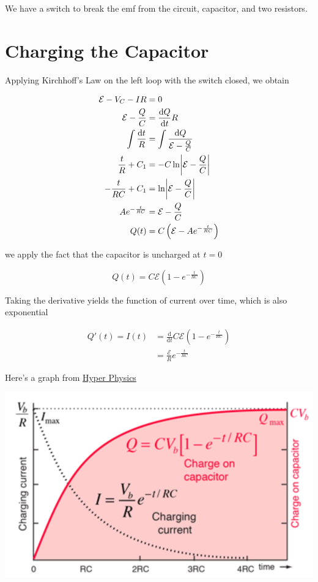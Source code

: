 We have a switch to break the emf from the circuit, capacitor, and two resistors. 

\section{Charging the Capacitor}

Applying Kirchhoff's Law on the left loop with the switch closed, we obtain 

\begin{align*}
    \mathcal{E} - V_C - IR &= 0\\
    \mathcal{E} - \frac{Q}{C} &= \frac{\mathrm{d}Q}{\mathrm{d}t} R\\
    \int \frac{\mathrm{d}t}{R} &= \int \frac{\mathrm{d}Q}{\mathcal{E} - \frac{Q}{C}}\\
    \frac{t}{R} + C_1 &= -C \ln\abs{\mathcal{E} - \frac{Q}{C}}\\
    -\frac{t}{RC} + C_1 &= \ln\abs{\mathcal{E} - \frac{Q}{C}}\\
    Ae^{-\frac{t}{RC}} &= \mathcal{E} - \frac{Q}{C}\\
    Q(t) &= C \left(\mathcal{E} - Ae^{-\frac{t}{RC}}\right)
\end{align*}

we apply the fact that the capacitor is uncharged at $t = 0$

\[\boxed{Q(t) = C \mathcal{E} \left(1 - e^{-\frac{t}{RC}}\right)}\]

Taking the derivative yields the function of current over time, which is also exponential

\begin{align*}
    Q'(t) = I(t) &= \frac{\mathrm{d}}{\mathrm{d}t} C \mathcal{E} \left(1 - e^{-\frac{t}{RC}}\right)\\
    &= \boxed{\frac{\mathcal{E}}{R} e^{-\frac{t}{RC}}}
\end{align*}

Here's a graph from \href{http://hyperphysics.phy-astr.gsu.edu/hbase/hph.html}{Hyper Physics}

\begin{center}
    \includegraphics[scale=0.6]{assets/hp-c-charging.png}
\end{center}

